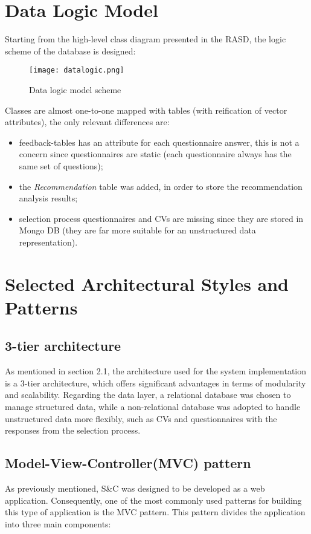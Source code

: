 		











	\section{Data Logic Model}
		Starting from the high-level class diagram presented in the RASD, the logic scheme of the database is designed:
		\begin{figure}[H]
			\centering
			\texttt{[image: datalogic.png]}
			\caption{Data logic model scheme}
		\end{figure}
		Classes are almost one-to-one mapped with tables (with reification of vector attributes), the only relevant differences are:
		\begin{itemize}
			\item feedback-tables has an attribute for each questionnaire answer, this is not a concern since questionnaires are static (each questionnaire always has the same set of questions);
			\item the \emph{Recommendation} table was added, in order to store the recommendation analysis results;
			\item selection process questionnaires and CVs are missing since they are stored in Mongo DB (they are far more suitable for an unstructured data representation).
		\end{itemize}
	\section{Selected Architectural Styles and Patterns}
	
		\subsection{3-tier architecture}
			As mentioned in section 2.1, the architecture used for the system implementation is a 3-tier architecture, which offers significant advantages in terms of modularity and scalability. Regarding the data layer, a relational database was chosen to manage structured data, while a non-relational database was adopted to handle unstructured data more flexibly, such as CVs and questionnaires with the responses from the selection process.
			
			
		\subsection{Model-View-Controller(MVC) pattern}
			As previously mentioned, S\&C was designed to be developed as a web application. Consequently, one of the most commonly used patterns for building this type of application is the MVC pattern. This pattern divides the application into three main components:
			
